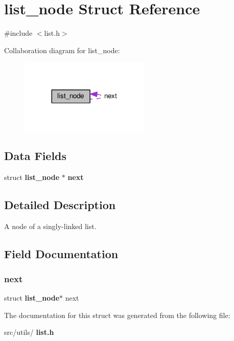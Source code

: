 \section{list\+\_\+node Struct Reference}
\label{structlist__node}


{\ttfamily \#include $<$list.\+h$>$}



Collaboration diagram for list\+\_\+node\+:
\nopagebreak
\begin{figure}[H]
\begin{center}
\leavevmode
\includegraphics[width=176pt]{structlist__node__coll__graph}
\end{center}
\end{figure}
\subsection*{Data Fields}
\begin{DoxyCompactItemize}
\item 
struct \textbf{ list\+\_\+node} $\ast$ \textbf{ next}
\end{DoxyCompactItemize}


\subsection{Detailed Description}
A node of a singly-\/linked list. 

\subsection{Field Documentation}
\mbox{\label{structlist__node_a233bfe7cf29d581dfb42116900d0739f}} 
\subsubsection{next}
{\footnotesize\ttfamily struct \textbf{ list\+\_\+node}$\ast$ next}



The documentation for this struct was generated from the following file\+:\begin{DoxyCompactItemize}
\item 
src/utils/\textbf{ list.\+h}\end{DoxyCompactItemize}
